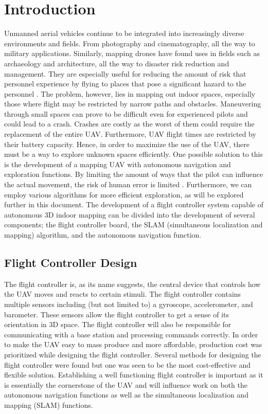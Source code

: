 \documentclass[english]{upeeei}
\begin{document}
\begin{frontmatter}
\setlength{\parskip}{0pt}
\tableofcontents
\listoffigures
\end{frontmatter}
\def\MASTERDOC{true}

\chapter{Introduction}
Unmanned aerial vehicles continue to be integrated into increasingly diverse environments and
fields. From photography and cinematography, all the way to military applications. Similarly, mapping drones have found uses
in fields such as archaeology and architecture, all the way to disaster risk reduction and management. They are especially
useful for reducing the amount of risk that personnel experience by flying to places that pose a significant hazard to 
the personnel \cite{ICNSC2010}. The problem, however, lies in mapping out indoor spaces, especially those where flight may
be restricted by narrow paths and obstacles. Maneuvering through small spaces can prove to be difficult even for experienced
pilots and could lead to a crash. Crashes are costly as the worst of them could require the replacement of the entire UAV.
Furthermore, UAV flight times are restricted by their battery capacity. Hence, in order to maximize the use of the UAV, there
must be a way to explore unknown spaces efficiently.
One possible solution to this is the development of a mapping UAV with autonomous navigation and exploration functions. By
limiting the amount of ways that the pilot can influence the actual movement, the risk of human error is limited \cite{AutoFunc}.
Furthermore, we can employ various algorithms for more efficient exploration, as will be explored further in this document. 
\newline
\newline
The development of a flight controller 
system capable of autonomous 3D indoor mapping can be divided into the development of several components; the flight 
controller board, the SLAM (simultaneous localization and mapping) algorithm, and the autonomous navigation function.
\section{Flight Controller Design}
The flight controller is, as its name suggests, the central device that controls how the UAV moves and reacts to certain
stimuli. The flight controller contains multiple sensors including (but not limited to) a gyroscope, accelerometer, and
barometer. These sensors allow the flight controller to get a sense of its orientation in 3D space. The flight controller 
will also be responsible for communicating with a base station and processing commands correctly. In order to make the
UAV easy to mass produce and more affordable, production cost was prioritized while designing the flight controller.
Several methods for designing the flight controller were found but one was seen to be the most cost-effective and
flexible solution. Establishing a well functioning flight controller is important as it is essentially the cornerstone of the
UAV and will influence work on both the autonomous navigation functions as well as the simultaneous localization and
mapping (SLAM) functions.
\end{document}
